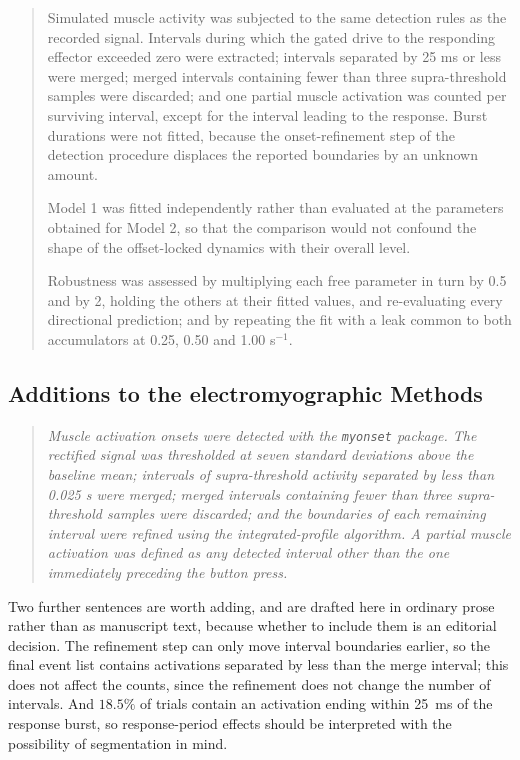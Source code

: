 \documentclass[a4paper,11pt]{article}
\newcommand{\1}{\mathbbm{1}}
\begin{document}
\begin{quote}
Simulated muscle activity was subjected to the same detection rules as the recorded
signal. Intervals during which the gated drive to the responding effector exceeded zero
were extracted; intervals separated by 25 ms or less were merged; merged intervals
containing fewer than three supra-threshold samples were discarded; and one partial
muscle activation was counted per surviving interval, except for the interval leading to
the response. Burst durations were not fitted, because the onset-refinement step of the
detection procedure displaces the reported boundaries by an unknown amount.

Model 1 was fitted independently rather than evaluated at the parameters obtained for
Model 2, so that the comparison would not confound the shape of the offset-locked
dynamics with their overall level.

Robustness was assessed by multiplying each free parameter in turn by 0.5 and by 2,
holding the others at their fitted values, and re-evaluating every directional
prediction; and by repeating the fit with a leak common to both accumulators at 0.25,
0.50 and 1.00 s$^{-1}$.
\end{quote}

\subsection*{Additions to the electromyographic Methods}

\begin{quote}\small\itshape
Muscle activation onsets were detected with the \texttt{myonset} package. The rectified
signal was thresholded at seven standard deviations above the baseline mean; intervals
of supra-threshold activity separated by less than 0.025 s were merged; merged intervals
containing fewer than three supra-threshold samples were discarded; and the boundaries
of each remaining interval were refined using the integrated-profile algorithm. A
partial muscle activation was defined as any detected interval other than the one
immediately preceding the button press.
\end{quote}

\noindent Two further sentences are worth adding, and are drafted here in ordinary
prose rather than as manuscript text, because whether to include them is an editorial
decision. The refinement step can only move interval boundaries earlier, so the final
event list contains activations separated by less than the merge interval; this does not
affect the counts, since the refinement does not change the number of intervals.
And $18.5\%$ of trials contain an activation ending within 25~ms of the response burst,
so response-period effects should be interpreted with the possibility of segmentation
in mind.
\end{document}
